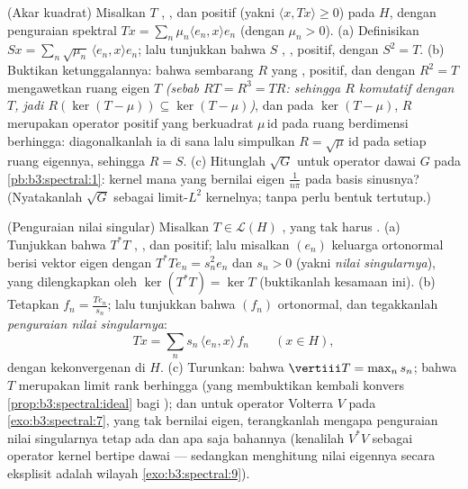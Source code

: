 \begin{exercise}[$\star\star$]\label{exo:b3:spectral:11}
(Akar kuadrat) Misalkan $T$ , , dan positif
(yakni $\langle x, Tx\rangle \geq 0$) pada  $H$, dengan
penguraian spektral $Tx = \sum_n\mu_n\langle e_n,
x\rangle e_n$ (dengan $\mu_n > 0$).
(a) Definisikan $Sx = \sum_n\sqrt{\mu_n}\,\langle e_n, x\rangle
e_n$; lalu tunjukkan bahwa $S$ , , positif, dengan $S^2
= T$.
(b) Buktikan ketunggalannya: bahwa sembarang $R$ yang , positif, dan 
dengan $R^2 = T$ mengawetkan ruang eigen $T$
\emph{(sebab $RT = R^3 = TR$: sehingga $R$ komutatif dengan $T$, jadi
$R(\ker(T - \mu)) \subseteq \ker(T - \mu)$)}, dan pada
$\ker(T - \mu)$, $R$ merupakan operator positif yang berkuadrat
$\mu\,\mathrm{id}$ pada ruang berdimensi berhingga:
diagonalkanlah ia di sana lalu simpulkan $R =
\sqrt\mu\,\mathrm{id}$ pada setiap ruang eigennya, sehingga $R = S$.
(c) Hitunglah $\sqrt G$ untuk operator dawai $G$ pada
\cref{pb:b3:spectral:1}: kernel mana yang bernilai eigen
$\frac1{n\pi}$ pada basis sinusnya? (Nyatakanlah $\sqrt G$ sebagai
limit-$L^2$ kernelnya; tanpa perlu bentuk tertutup.)
\end{exercise}

\begin{exercise}[$\star\star\star$]\label{exo:b3:spectral:12}
(Penguraian nilai singular) Misalkan $T \in \mathcal L(H)$
\emph{}, yang tak harus .
(a) Tunjukkan bahwa $T^*T$ , , dan positif; lalu misalkan
$(e_n)$ keluarga ortonormal berisi vektor eigen dengan
$T^*Te_n = s_n^2e_n$ dan $s_n > 0$ (yakni \emph{nilai singularnya}),
yang dilengkapkan oleh $\ker(T^*T) = \ker T$ (buktikanlah kesamaan ini).
(b) Tetapkan $f_n = \frac{Te_n}{s_n}$; lalu tunjukkan bahwa $(f_n)$
ortonormal, dan tegakkanlah \emph{penguraian nilai singularnya}:
\[
Tx = \sum_n s_n\,\langle e_n, x\rangle\,f_n
\qquad (x \in H),
\]
dengan kekonvergenan di $H$.
(c) Turunkan: bahwa $\vertiii T = \max_ns_n$; bahwa $T$ merupakan limit  rank berhingga (yang membuktikan kembali
konvers \cref{prop:b3:spectral:ideal} bagi ); dan untuk operator Volterra $V$ pada
\cref{exo:b3:spectral:7}, yang tak bernilai eigen, terangkanlah
mengapa penguraian nilai singularnya tetap ada dan apa saja bahannya
(kenalilah $V^*V$ sebagai operator kernel bertipe dawai ---
sedangkan menghitung nilai eigennya secara eksplisit adalah
wilayah \cref{exo:b3:spectral:9}).
\end{exercise}

